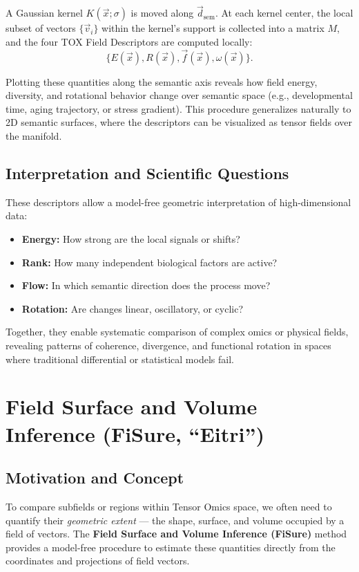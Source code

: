 \documentclass{article}
\begin{document}
A Gaussian kernel \(K(\vec{x}; \sigma)\) is moved along \(\vec{d}_{\text{sem}}\).  
At each kernel center, the local subset of vectors 
\(\{\vec{v}_i\}\) within the kernel’s support is collected into a matrix \(M\), 
and the four TOX Field Descriptors are computed locally:
\[
\{E(\vec{x}), R(\vec{x}), \vec{f}(\vec{x}), \omega(\vec{x})\}.
\]

Plotting these quantities along the semantic axis reveals how 
field energy, diversity, and rotational behavior change over semantic space 
(e.g., developmental time, aging trajectory, or stress gradient).  
This procedure generalizes naturally to 2D semantic surfaces, 
where the descriptors can be visualized as tensor fields over the manifold.

\subsection{Interpretation and Scientific Questions}

These descriptors allow a model-free geometric interpretation of high-dimensional data:
\begin{itemize}
  \item \textbf{Energy:} How strong are the local signals or shifts?
  \item \textbf{Rank:} How many independent biological factors are active?
  \item \textbf{Flow:} In which semantic direction does the process move?
  \item \textbf{Rotation:} Are changes linear, oscillatory, or cyclic?
\end{itemize}

Together, they enable systematic comparison of complex omics or physical fields, 
revealing patterns of coherence, divergence, and functional rotation 
in spaces where traditional differential or statistical models fail.

\section{Field Surface and Volume Inference (FiSure, ``Eitri'')}

\subsection{Motivation and Concept}

To compare subfields or regions within Tensor Omics space, we often need 
to quantify their \textit{geometric extent} --- the shape, surface, and volume 
occupied by a field of vectors.  
The \textbf{Field Surface and Volume Inference (FiSure)} method provides a 
model-free procedure to estimate these quantities directly from the coordinates 
and projections of field vectors.  
\end{document}
